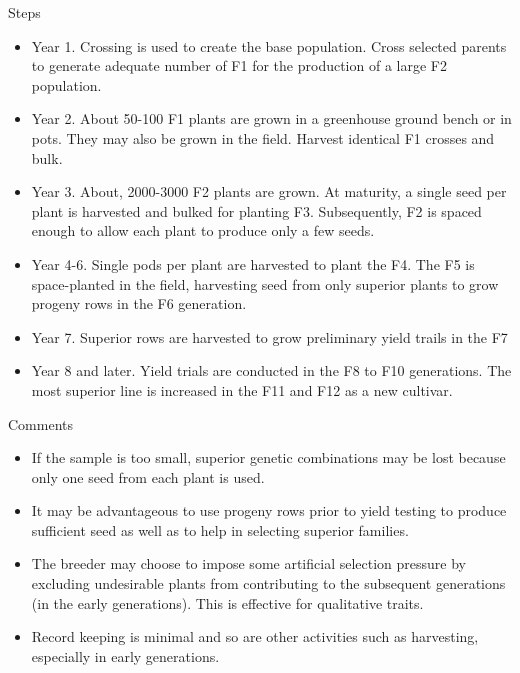 \documentclass[11pt,ignorenonframetext,aspectratio=169]{beamer}
\providecommand{\tightlist}{%
  \setlength{\itemsep}{0pt}\setlength{\parskip}{0pt}}
\begin{document}
\begin{frame}{Steps}
\protect\hypertarget{steps}{}
\begin{itemize}
\tightlist
\item
  Year 1. Crossing is used to create the base population. Cross selected
  parents to generate adequate number of F1 for the production of a
  large F2 population.
\item
  Year 2. About 50-100 F1 plants are grown in a greenhouse ground bench
  or in pots. They may also be grown in the field. Harvest identical F1
  crosses and bulk.
\item
  Year 3. About, 2000-3000 F2 plants are grown. At maturity, a single
  seed per plant is harvested and bulked for planting F3. Subsequently,
  F2 is spaced enough to allow each plant to produce only a few seeds.
\item
  Year 4-6. Single pods per plant are harvested to plant the F4. The F5
  is space-planted in the field, harvesting seed from only superior
  plants to grow progeny rows in the F6 generation.
\item
  Year 7. Superior rows are harvested to grow preliminary yield trails
  in the F7
\item
  Year 8 and later. Yield trials are conducted in the F8 to F10
  generations. The most superior line is increased in the F11 and F12 as
  a new cultivar.
\end{itemize}
\end{frame}

\begin{frame}{Comments}
\protect\hypertarget{comments}{}
\begin{itemize}
\tightlist
\item
  If the sample is too small, superior genetic combinations may be lost
  because only one seed from each plant is used.
\item
  It may be advantageous to use progeny rows prior to yield testing to
  produce sufficient seed as well as to help in selecting superior
  families.
\item
  The breeder may choose to impose some artificial selection pressure by
  excluding undesirable plants from contributing to the subsequent
  generations (in the early generations). This is effective for
  qualitative traits.
\item
  Record keeping is minimal and so are other activities such as
  harvesting, especially in early generations.
\end{itemize}
\end{frame}
\end{document}
